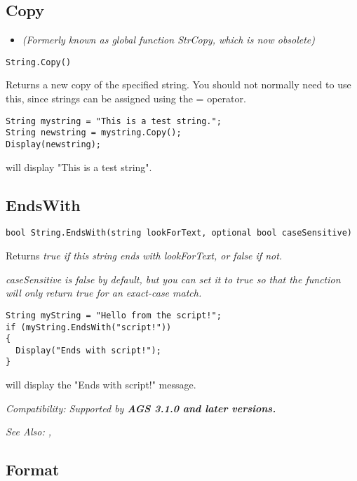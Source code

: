 \subsection{Copy}\label{String.Copy}%

\begin{itemize}
\item \it{(Formerly known as global function StrCopy, which is now obsolete)}
\end{itemize}

\begin{verbatim}
String.Copy()
\end{verbatim}
Returns a new copy of the specified string. You should not normally need to use this,
since strings can be assigned using the = operator.

\begin{verbatim}
String mystring = "This is a test string.";
String newstring = mystring.Copy();
Display(newstring);
\end{verbatim}
will display "This is a test string".


\subsection{EndsWith}\label{String.EndsWith}%

\begin{verbatim}
bool String.EndsWith(string lookForText, optional bool caseSensitive)
\end{verbatim}
Returns \it{true} if this string ends with \it{lookForText}, or \it{false} if not.

\it{caseSensitive} is \it{false} by default, but you can set it to true so that the
function will only return \it{true} for an exact-case match.

\begin{verbatim}
String myString = "Hello from the script!";
if (myString.EndsWith("script!"))
{
  Display("Ends with script!");
}
\end{verbatim}
will display the "Ends with script!" message.

\it{Compatibility:} Supported by \bf{AGS 3.1.0} and later versions.

\it{See Also:} ,


\subsection{Format}\label{String.Format}%

